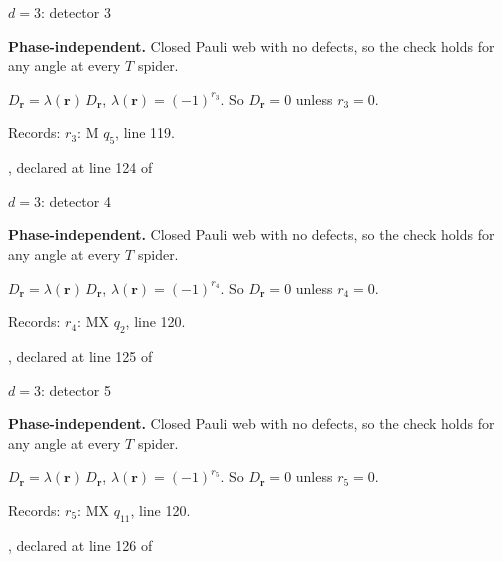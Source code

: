 \label{d3_det003}
{\Large $d=3$: detector 3}\par
\textbf{Phase-independent.} Closed Pauli web with no defects, so the check holds for any angle at every $T$ spider.
\begin{center}
\end{center}
\vspace{-1mm}
$D_{\boldsymbol r}=\lambda(\boldsymbol r)\,D_{\boldsymbol r}$, \quad $\lambda(\boldsymbol r)=(-1)^{r_{3}}$. \qquad So $D_{\boldsymbol r}=0$ unless $r_{3}=0$.
\par\smallskip\begin{minipage}{.98\linewidth}\small Records: $r_{3}$: M $q_{5}$, line 119.\end{minipage}
\vfill
{\footnotesize\texttt{}, declared at line 124 of \texttt{}}
\newpage

\label{d3_det004}
{\Large $d=3$: detector 4}\par
\textbf{Phase-independent.} Closed Pauli web with no defects, so the check holds for any angle at every $T$ spider.
\begin{center}
\end{center}
\vspace{-1mm}
$D_{\boldsymbol r}=\lambda(\boldsymbol r)\,D_{\boldsymbol r}$, \quad $\lambda(\boldsymbol r)=(-1)^{r_{4}}$. \qquad So $D_{\boldsymbol r}=0$ unless $r_{4}=0$.
\par\smallskip\begin{minipage}{.98\linewidth}\small Records: $r_{4}$: MX $q_{2}$, line 120.\end{minipage}
\vfill
{\footnotesize\texttt{}, declared at line 125 of \texttt{}}
\newpage

\label{d3_det005}
{\Large $d=3$: detector 5}\par
\textbf{Phase-independent.} Closed Pauli web with no defects, so the check holds for any angle at every $T$ spider.
\begin{center}
\end{center}
\vspace{-1mm}
$D_{\boldsymbol r}=\lambda(\boldsymbol r)\,D_{\boldsymbol r}$, \quad $\lambda(\boldsymbol r)=(-1)^{r_{5}}$. \qquad So $D_{\boldsymbol r}=0$ unless $r_{5}=0$.
\par\smallskip\begin{minipage}{.98\linewidth}\small Records: $r_{5}$: MX $q_{11}$, line 120.\end{minipage}
\vfill
{\footnotesize\texttt{}, declared at line 126 of \texttt{}}
\newpage

